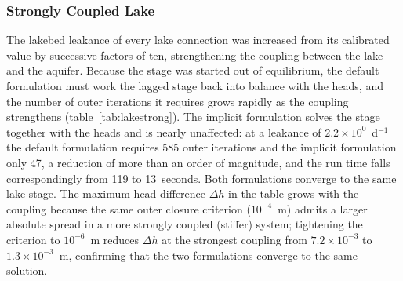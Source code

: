 \subsubsection{Strongly Coupled Lake}

The lakebed leakance of every lake connection was increased from its calibrated value by successive factors of ten, strengthening the coupling between the lake and the aquifer. Because the stage was started out of equilibrium, the default formulation must work the lagged stage back into balance with the heads, and the number of outer iterations it requires grows rapidly as the coupling strengthens (table~\ref{tab:lakestrong}). The implicit formulation solves the stage together with the heads and is nearly unaffected: at a leakance of $2.2 \times 10^{0}$~d$^{-1}$ the default formulation requires 585 outer iterations and the implicit formulation only 47, a reduction of more than an order of magnitude, and the run time falls correspondingly from 119 to 13~seconds. Both formulations converge to the same lake stage. The maximum head difference $\Delta h$ in the table grows with the coupling because the same outer closure criterion ($10^{-4}$~m) admits a larger absolute spread in a more strongly coupled (stiffer) system; tightening the criterion to $10^{-6}$~m reduces $\Delta h$ at the strongest coupling from $7.2 \times 10^{-3}$ to $1.3 \times 10^{-3}$~m, confirming that the two formulations converge to the same solution.

